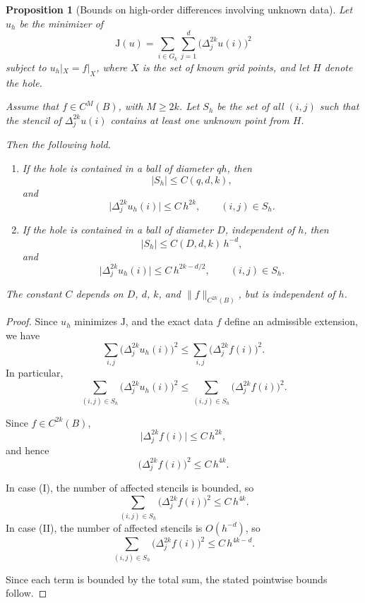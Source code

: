 \documentclass[10pt,a4paper]{amsart}
\newtheorem{proposition}{Proposition}
\begin{document}
\begin{proposition}[Bounds on high-order differences
involving unknown data]
Let $u_h$ be the minimizer of
\[
\mathrm{J}(u)
=
\sum_{i\in G_k}\sum_{j=1}^d
\bigl(\Delta_j^{2k}u(i)\bigr)^2
\]
subject to $u_h|_X = f|_X$,
where $X$ is the set of known grid points,
and let $H$ denote the hole.

Assume that $f\in C^M(B)$,
with $M\ge 2k$.
Let $S_h$ be the set of all $(i,j)$
such that the stencil of $\Delta_j^{2k}u(i)$
contains at least one unknown point from $H$.

Then the following hold.

\begin{enumerate}
\item[(I)]
If the hole is contained in a ball
of diameter $qh$, then
\[
|S_h|\le C(q,d,k),
\]
and
\[
\bigl|\Delta_j^{2k}u_h(i)\bigr|
\le C\,h^{2k},
\qquad (i,j)\in S_h.
\]

\item[(II)]
If the hole is contained in a ball
of diameter $D$, independent of $h$,
then
\[
|S_h|\le C(D,d,k)\,h^{-d},
\]
and
\[
\bigl|\Delta_j^{2k}u_h(i)\bigr|
\le C\,h^{2k-d/2},
\qquad (i,j)\in S_h.
\]
\end{enumerate}

The constant $C$ depends on
$D$, $d$, $k$,
and $\|f\|_{C^{2k}(B)}$,
but is independent of $h$.
\end{proposition}

\begin{proof}
Since $u_h$ minimizes $\mathrm{J}$,
and the exact data $f$ define an admissible extension,
we have
\[
\sum_{i,j}
\bigl(\Delta_j^{2k}u_h(i)\bigr)^2
\le
\sum_{i,j}
\bigl(\Delta_j^{2k}f(i)\bigr)^2.
\]
In particular,
\[
\sum_{(i,j)\in S_h}
\bigl(\Delta_j^{2k}u_h(i)\bigr)^2
\le
\sum_{(i,j)\in S_h}
\bigl(\Delta_j^{2k}f(i)\bigr)^2.
\]

Since $f\in C^{2k}(B)$,
\[
\bigl|\Delta_j^{2k}f(i)\bigr|
\le C\,h^{2k},
\]
and hence
\[
\bigl(\Delta_j^{2k}f(i)\bigr)^2
\le C\,h^{4k}.
\]

In case (I),
the number of affected stencils is bounded,
so
\[
\sum_{(i,j)\in S_h}
\bigl(\Delta_j^{2k}f(i)\bigr)^2
\le C\,h^{4k}.
\]
In case (II),
the number of affected stencils is $O(h^{-d})$,
so
\[
\sum_{(i,j)\in S_h}
\bigl(\Delta_j^{2k}f(i)\bigr)^2
\le C\,h^{4k-d}.
\]

Since each term is bounded by the total sum,
the stated pointwise bounds follow.
\end{proof}
\end{document}
